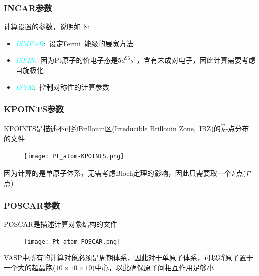 \frame
{
	\frametitle{\textrm{INCAR}参数}
计算设置的参数，说明如下:~
\begin{itemize}
	\item \textcolor{cyan}{\textit{ISMEAR}}:~设定\textrm{Fermi~}能级的展宽方法
		\vskip 5pt
		{\fontsize{7.2pt}{5.2pt}}
	\item \textcolor{cyan}{\textit{ISPIN}}:~因为\textrm{Pt}原子的价电子态是$5\mathit{d}^96\mathit{s}^1$，含有未成对电子，因此计算需要考虑自旋极化
	\vskip 5pt
	{\fontsize{7.2pt}{5.2pt}}
	\item \textcolor{cyan}{\textit{ISYM}}:~控制对称性的计算参数%
\end{itemize}
}
\frame
{
	\frametitle{\textrm{KPOINTS}参数}
\textrm{KPOINTS}是描述不可约\textrm{Brillouin}区(\textrm{Irreducible Brillouin Zone,~IBZ})的$\vec k$-点分布的文件%
\begin{figure}[h!]
\centering
\vskip -5pt
\texttt{[image: Pt\_atom-KPOINTS.png]}
\caption{\fontsize{6.2pt}{5.2pt}}%
\label{Pt_atom:KPOINTS}
\end{figure}
因为计算的是单原子体系，无需考虑\textrm{Bloch}定理的影响，因此只需要取一个$\vec k$点($\Gamma$点)
}
\frame
{
	\frametitle{\textrm{POSCAR}参数}
\textrm{POSCAR}是描述计算对象结构的文件%
\begin{figure}[h!]
\centering
\texttt{[image: Pt\_atom-POSCAR.png]}
\caption{\fontsize{6.2pt}{5.2pt}}%
\label{Pt_atom:POSCAR}
\end{figure}
\textrm{VASP}中所有的计算对象必须是周期体系，因此对于单原子体系，可以将原子置于一个大的超晶胞($10\times10\times10$)中心，以此确保原子间相互作用足够小
}
